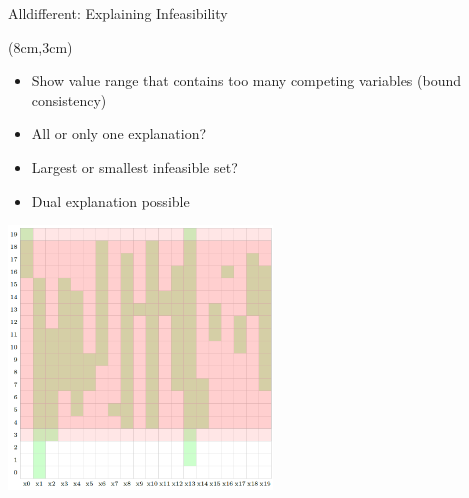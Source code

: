 \begin{frame}{Alldifferent: Explaining Infeasibility}
\begin{textblock*}{7cm}(8cm,3cm)
\begin{itemize}
    \item Show value range that contains too many competing variables (bound consistency)
    \item All or only one explanation?
    \item Largest or smallest infeasible set?
    \item Dual explanation possible
\end{itemize}
\end{textblock*}
\includegraphics[width=7cm]{images/alldifferentexplanation.PNG}    
\end{frame}

